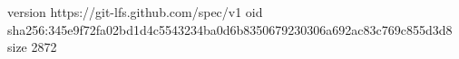 version https://git-lfs.github.com/spec/v1
oid sha256:345e9f72fa02bd1d4c5543234ba0d6b8350679230306a692ac83c769c855d3d8
size 2872
